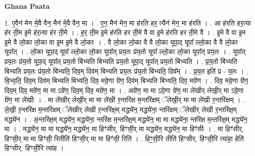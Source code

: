 \documentclass[17pt]{extarticle}
\begin{document}
\textbf{Ghana Paata } \newline

1. ए॒वैन॑ मेन मे॒वै वैन॒ मैन॑ मे॒वै वैन॒ मा । . ए॒न॒ मैन॑ मेन॒ मा ह॑रति हर॒ त्यैन॑ मेन॒ मा ह॑रति । . आ ह॑रति हर॒त्या ह॑र ती॒म इ॒मे ह॑र॒त्या ह॑र ती॒मे । . ह॒र॒ ती॒म इ॒मे ह॑रति हर ती॒मे वै वा इ॒मे ह॑रति हर ती॒मे वै । . इ॒मे वै वा इ॒म इ॒मे वै लो॒का लो॒का वा इ॒म इ॒मे वै लो॒काः । . वै लो॒का लो॒का वै वै लो॒का यूपा॒द् यूपा᳚ ल्लो॒का वै वै लो॒का यूपा᳚त् । . लो॒का यूपा॒द् यूपा᳚ ल्लो॒का लो॒का यूपा᳚त् प्रय॒तः प्र॑य॒तो यूपा᳚ ल्लो॒का लो॒का यूपा᳚त् प्रय॒तः । . यूपा᳚त् प्रय॒तः प्र॑य॒तो यूपा॒द् यूपा᳚त् प्रय॒तो बि॑भ्यति बिभ्यति प्रय॒तो यूपा॒द् यूपा᳚त् प्रय॒तो बि॑भ्यति । . प्र॒य॒तो बि॑भ्यति बिभ्यति प्रय॒तः प्र॑य॒तो बि॑भ्यति॒ दिव॒म् दिव॑म् बिभ्यति प्रय॒तः प्र॑य॒तो बि॑भ्यति॒ दिव᳚म् । . प्र॒य॒त इति॑ प्र - य॒तः । . बि॒भ्य॒ति॒ दिव॒म् दिव॑म् बिभ्यति बिभ्यति॒ दिव॒ मग्रे॒णा ग्रे॑ण॒ दिव॑म् बिभ्यति बिभ्यति॒ दिव॒ मग्रे॑ण । . दिव॒ मग्रे॒णा ग्रे॑ण॒ दिव॒म् दिव॒ मग्रे॑ण॒ मा मा ऽग्रे॑ण॒ दिव॒म् दिव॒ मग्रे॑ण॒ मा । . अग्रे॑ण॒ मा मा ऽग्रे॒णा ग्रे॑ण॒ मा ले॑खीर् लेखी॒र् मा ऽग्रे॒णा ग्रे॑ण॒ मा ले॑खीः । . मा ले॑खीर् लेखी॒र् मा मा ले॑खी र॒न्तरि॑क्ष म॒न्तरि॑क्षम् ॅलेखी॒र् मा मा ले॑खी र॒न्तरि॑क्षम् । . ले॒खी॒ र॒न्तरि॑क्ष म॒न्तरि॑क्षम् ॅलेखीर् लेखी र॒न्तरि॑क्ष॒म् मद्ध्ये॑न॒ मद्ध्ये॑ना॒ न्तरि॑क्षम् ॅलेखीर् लेखी र॒न्तरि॑क्ष॒म् मद्ध्ये॑न । . अ॒न्तरि॑क्ष॒म् मद्ध्ये॑न॒ मद्ध्ये॑ना॒ न्तरि॑क्ष म॒न्तरि॑क्ष॒म् मद्ध्ये॑न॒ मा मा मद्ध्ये॑ना॒ न्तरि॑क्ष म॒न्तरि॑क्ष॒म् मद्ध्ये॑न॒ मा । . मद्ध्ये॑न॒ मा मा मद्ध्ये॑न॒ मद्ध्ये॑न॒ मा हिꣳ॑सीर्. हिꣳसी॒र् मा मद्ध्ये॑न॒ मद्ध्ये॑न॒ मा हिꣳ॑सीः । . मा हिꣳ॑सीर्. हिꣳसी॒र् मा मा हिꣳ॑सी॒ रितीति॑ हिꣳसी॒र् मा मा हिꣳ॑सी॒ रिति॑ । . हिꣳ॒॒सी॒रि तीति॑ हिꣳसीर्. हिꣳसी॒रि त्या॑हा॒ हेति॑ हिꣳसीर्. हिꣳसी॒रि त्या॑ह । \newline
\end{document}
